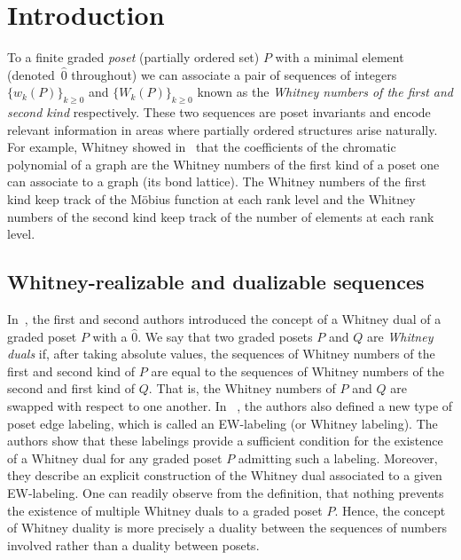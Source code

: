 \section{Introduction}

To a finite graded \emph{poset}  (partially ordered set) $P$ with a minimal element (denoted~$\hat{0}$ throughout) we can associate a pair of sequences of integers $\{w_k(P)\}_{k\ge 0}$ and $\{W_k(P)\}_{k\ge 0}$ known as the \emph{Whitney numbers of the first and second kind} respectively. These two sequences  are poset 
 invariants and encode relevant information in areas where partially ordered structures arise naturally. For example, Whitney showed in~\cite{Whitney1932} that the coefficients of the  chromatic polynomial of a graph are the Whitney numbers of the first kind of a poset one can associate to a graph (its bond lattice). The Whitney numbers of the first kind  keep track of the M\"obius function at each rank level and the Whitney numbers of the second kind keep track of the number of elements at each rank level. 

 
 \subsection{Whitney-realizable and dualizable sequences}
 In~\cite{GonzalezHallam2021}, the first and second authors introduced the concept of a Whitney dual of a graded poset $P$ with a $\hat{0}$.
 We say that two graded posets $P$ and $Q$ are \emph{Whitney duals} if, after taking absolute values, the sequences of Whitney numbers of the first and second kind of $P$ are equal to the sequences of Whitney numbers of the second and first kind of $Q$. That is, the Whitney numbers of $P$ and $Q$ are swapped with respect to one another. In ~\cite{GonzalezHallam2021}, the authors also defined a new type of poset edge labeling, which is called an EW-labeling (or Whitney labeling). The authors show that these labelings provide a sufficient condition for the existence of a Whitney dual for any graded poset $P$ admitting such a labeling.  Moreover, they describe an explicit construction of the Whitney dual associated to a given EW-labeling.  One can readily observe from the definition, that nothing prevents the existence of multiple Whitney duals to a graded poset $P$. Hence, the concept of Whitney duality is more precisely a duality between the sequences of numbers involved rather than a duality between posets. 

